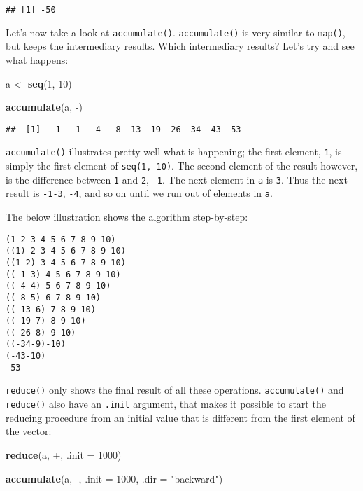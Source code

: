\documentclass[
]{article}
\newenvironment{Shaded}{\begin{snugshade}}{\end{snugshade}}
\newcommand{\DataTypeTok}[1]{\textcolor[rgb]{0.13,0.29,0.53}{#1}}
\newcommand{\DecValTok}[1]{\textcolor[rgb]{0.00,0.00,0.81}{#1}}
\newcommand{\KeywordTok}[1]{\textcolor[rgb]{0.13,0.29,0.53}{\textbf{#1}}}
\newcommand{\NormalTok}[1]{#1}
\newcommand{\StringTok}[1]{\textcolor[rgb]{0.31,0.60,0.02}{#1}}
\begin{document}
\begin{verbatim}
## [1] -50
\end{verbatim}

Let's now take a look at \texttt{accumulate()}. \texttt{accumulate()} is very similar to \texttt{map()}, but keeps the
intermediary results. Which intermediary results? Let's try and see what happens:

\begin{Shaded}
\begin{Highlighting}[]
\NormalTok{a \textless{}{-}}\StringTok{ }\KeywordTok{seq}\NormalTok{(}\DecValTok{1}\NormalTok{, }\DecValTok{10}\NormalTok{)}

\KeywordTok{accumulate}\NormalTok{(a, }\StringTok{\textasciigrave{}}\DataTypeTok{{-}}\StringTok{\textasciigrave{}}\NormalTok{)}
\end{Highlighting}
\end{Shaded}

\begin{verbatim}
##  [1]   1  -1  -4  -8 -13 -19 -26 -34 -43 -53
\end{verbatim}

\texttt{accumulate()} illustrates pretty well what is happening; the first element, \texttt{1}, is simply the
first element of \texttt{seq(1,\ 10)}. The second element of the result however, is the difference between
\texttt{1} and \texttt{2}, \texttt{-1}. The next element in \texttt{a} is \texttt{3}. Thus the next result is \texttt{-1-3}, \texttt{-4}, and so
on until we run out of elements in \texttt{a}.

The below illustration shows the algorithm step-by-step:

\begin{verbatim}
(1-2-3-4-5-6-7-8-9-10)
((1)-2-3-4-5-6-7-8-9-10)
((1-2)-3-4-5-6-7-8-9-10)
((-1-3)-4-5-6-7-8-9-10)
((-4-4)-5-6-7-8-9-10)
((-8-5)-6-7-8-9-10)
((-13-6)-7-8-9-10)
((-19-7)-8-9-10)
((-26-8)-9-10)
((-34-9)-10)
(-43-10)
-53
\end{verbatim}

\texttt{reduce()} only shows the final result of all these operations. \texttt{accumulate()} and \texttt{reduce()} also
have an \texttt{.init} argument, that makes it possible to start the reducing procedure from an initial
value that is different from the first element of the vector:

\begin{Shaded}
\begin{Highlighting}[]
\KeywordTok{reduce}\NormalTok{(a, }\StringTok{\textasciigrave{}}\DataTypeTok{+}\StringTok{\textasciigrave{}}\NormalTok{, }\DataTypeTok{.init =} \DecValTok{1000}\NormalTok{)}

\KeywordTok{accumulate}\NormalTok{(a, }\StringTok{\textasciigrave{}}\DataTypeTok{{-}}\StringTok{\textasciigrave{}}\NormalTok{, }\DataTypeTok{.init =} \DecValTok{1000}\NormalTok{, }\DataTypeTok{.dir =} \StringTok{"backward"}\NormalTok{)}
\end{Highlighting}
\end{Shaded}
\end{document}
